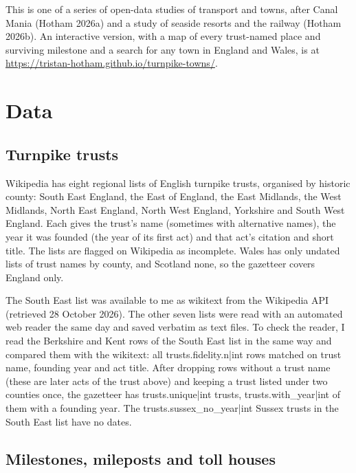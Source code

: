 \documentclass[11pt,a4paper]{article}
\begin{document}
This is one of a series of open-data studies of transport and towns, after Canal Mania (Hotham 2026a) and a study of seaside resorts and the railway (Hotham 2026b). An interactive version, with a map of every trust-named place and surviving milestone and a search for any town in England and Wales, is at \url{https://tristan-hotham.github.io/turnpike-towns/}.

\section{Data}

\subsection{Turnpike trusts}

Wikipedia has eight regional lists of English turnpike trusts, organised by historic county: South East England, the East of England, the East Midlands, the West Midlands, North East England, North West England, Yorkshire and South West England. Each gives the trust's name (sometimes with alternative names), the year it was founded (the year of its first act) and that act's citation and short title. The lists are flagged on Wikipedia as incomplete. Wales has only undated lists of trust names by county, and Scotland none, so the gazetteer covers England only.

The South East list was available to me as wikitext from the Wikipedia API (retrieved 28 October 2026). The other seven lists were read with an automated web reader the same day and saved verbatim as text files. To check the reader, I read the Berkshire and Kent rows of the South East list in the same way and compared them with the wikitext: all {{trusts.fidelity.n|int}} rows matched on trust name, founding year and act title. After dropping rows without a trust name (these are later acts of the trust above) and keeping a trust listed under two counties once, the gazetteer has {{trusts.unique|int}} trusts, {{trusts.with_year|int}} of them with a founding year. The {{trusts.sussex_no_year|int}} Sussex trusts in the South East list have no dates.

\subsection{Milestones, mileposts and toll houses}
\end{document}
